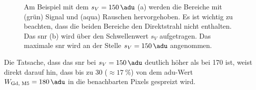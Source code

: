 \begin{figure}[H]
    \centering
    
    \caption{Am Beispiel mit dem $s_V = \SI{150}{\adu}$ (a) werden die Bereiche mit (grün) Signal und (aqua) Rauschen hervorgehoben. Es ist wichtig zu beachten, dass die beiden Bereiche den Direktstrahl nicht enthalten. Das \gls{snr} (b) wird über den Schwellenwert $s_V$ aufgetragen. Das maximale \gls{snr} wird an der Stelle $s_V = \SI{150}{\adu}$ angenommen.}
    \label{fig:th_150_mask_snr}
\end{figure}
%     
\noindent
Die Tatsache, dass das \gls{snr} bei $s_V = \SI{150}{\adu}$ deutlich höher als bei \SI{170}{\adu} ist, weist direkt darauf hin, dass bis zu \SI{30}{\adu} ($\approx \SI{17}{\percent}$) von dem \gls{adu}-Wert $W_\text{Gd, M5} = \SI{180}{\adu}$ in die benachbarten Pixels gespreizt wird. 

